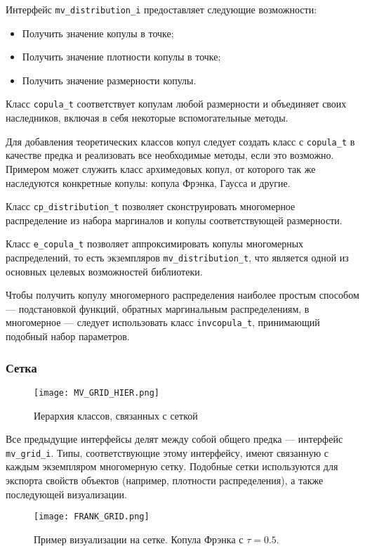 Интерфейс \texttt{mv\_distribution\_i} предоставляет следующие возможности:
\begin{itemize}
  \item Получить значение копулы в точке;
  \item Получить значение плотности копулы в точке;
  \item Получить значение размерности копулы.
\end{itemize}

Класс \texttt{copula\_t} соответствует копулам любой размерности и объединяет своих наследников, включая в себя некоторые вспомогательные методы.

Для добавления теоретических классов копул следует создать класс с \texttt{copula\_t} в качестве предка и реализовать все необходимые методы, если это возможно. Примером может служить класс архимедовых копул, от которого так же наследуются конкретные копулы: копула Фрэнка, Гаусса и другие.

Класс \texttt{cp\_distribution\_t} позволяет сконструировать многомерное распределение из набора маргиналов и копулы соответствующей размерности.

Класс \texttt{e\_copula\_t} позволяет аппроксимировать копулы многомерных распределений, то есть экземпляров \texttt{mv\_distribution\_t}, что является одной из основных целевых возможностей библиотеки.

Чтобы получить копулу многомерного распределения наиболее простым способом --- подстановкой функций, обратных маргинальным распределениям, в многомерное --- следует использовать класс \texttt{invcopula\_t}, принимающий подобный набор параметров.

\subsubsection*{Сетка}

\begin{figure}[H]
  \centering
  \texttt{[image: MV\_GRID\_HIER.png]}
  \caption{Иерархия классов, связанных с сеткой}
\end{figure}

Все предыдущие интерфейсы делят между собой общего предка --- интерфейс \texttt{mv\_grid\_i}. Типы, соответствующие этому интерфейсу, имеют связанную с каждым экземпляром многомерную сетку. Подобные сетки используются для экспорта свойств объектов (например, плотности распределения), а также последующей визуализации.

\begin{figure}[h]
	\centering
	\texttt{[image: FRANK\_GRID.png]}
	\caption{Пример визуализации на сетке. Копула Фрэнка с $\tau = 0.5$.}
\end{figure}

